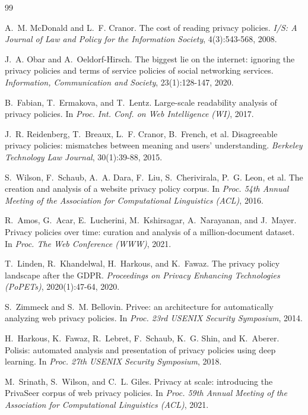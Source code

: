 \documentclass[11pt]{article}
\begin{document}
\begin{thebibliography}{99}

A.~M. McDonald and L.~F. Cranor.
The cost of reading privacy policies.
\emph{I/S: A Journal of Law and Policy for the Information Society},
4(3):543-568, 2008.

J.~A. Obar and A.~Oeldorf-Hirsch.
The biggest lie on the internet: ignoring the privacy policies and terms of
service policies of social networking services.
\emph{Information, Communication and Society}, 23(1):128-147, 2020.

B.~Fabian, T.~Ermakova, and T.~Lentz.
Large-scale readability analysis of privacy policies.
In \emph{Proc. Int. Conf. on Web Intelligence (WI)}, 2017.

J.~R. Reidenberg, T.~Breaux, L.~F. Cranor, B.~French, et al.
Disagreeable privacy policies: mismatches between meaning and users'
understanding.
\emph{Berkeley Technology Law Journal}, 30(1):39-88, 2015.

S.~Wilson, F.~Schaub, A.~A. Dara, F.~Liu, S.~Cherivirala, P.~G. Leon, et al.
The creation and analysis of a website privacy policy corpus.
In \emph{Proc. 54th Annual Meeting of the Association for Computational
Linguistics (ACL)}, 2016.

R.~Amos, G.~Acar, E.~Lucherini, M.~Kshirsagar, A.~Narayanan, and J.~Mayer.
Privacy policies over time: curation and analysis of a million-document dataset.
In \emph{Proc. The Web Conference (WWW)}, 2021.

T.~Linden, R.~Khandelwal, H.~Harkous, and K.~Fawaz.
The privacy policy landscape after the GDPR.
\emph{Proceedings on Privacy Enhancing Technologies (PoPETs)}, 2020(1):47-64,
2020.

S.~Zimmeck and S.~M. Bellovin.
Privee: an architecture for automatically analyzing web privacy policies.
In \emph{Proc. 23rd USENIX Security Symposium}, 2014.

H.~Harkous, K.~Fawaz, R.~Lebret, F.~Schaub, K.~G. Shin, and K.~Aberer.
Polisis: automated analysis and presentation of privacy policies using deep
learning.
In \emph{Proc. 27th USENIX Security Symposium}, 2018.

M.~Srinath, S.~Wilson, and C.~L. Giles.
Privacy at scale: introducing the PrivaSeer corpus of web privacy policies.
In \emph{Proc. 59th Annual Meeting of the Association for Computational
Linguistics (ACL)}, 2021.


\end{thebibliography}
\end{document}
